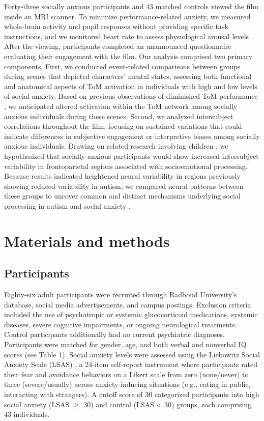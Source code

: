 Forty-three socially anxious participants and 43 matched controls viewed the film inside an MRI scanner. To minimize performance-related anxiety, we measured whole-brain activity and pupil responses without providing specific task instructions, and we monitored heart rate to assess physiological arousal levels \citep{wascher2021}. After the viewing, participants completed an unannounced questionnaire evaluating their engagement with the film. Our analysis comprised two primary components. First, we conducted event-related comparisons between groups during scenes that depicted characters' mental states, assessing both functional and anatomical aspects of ToM activation in individuals with high and low levels of social anxiety. Based on previous observations of diminished ToM performance \citep{baez2023}, we anticipated altered activation within the ToM network among socially anxious individuals during these scenes. Second, we analyzed intersubject correlations throughout the film, focusing on sustained variations that could indicate differences in subjective engagement or interpretive biases among socially anxious individuals. Drawing on related research involving children \citep{camacho2023}, we hypothesized that socially anxious participants would show increased intersubject variability in frontoparietal regions associated with socioemotional processing. Because results indicated heightened neural variability in regions previously showing reduced variability in autism, we compared neural patterns between these groups to uncover common and distinct mechanisms underlying social processing in autism and social anxiety \citep{white2009}.


\section*{Materials and methods}
\subsection*{Participants}
Eighty-six adult participants were recruited through Radboud University's database, social media advertisements, and campus postings. Exclusion criteria included the use of psychotropic or systemic glucocorticoid medications, systemic diseases, severe cognitive impairments, or ongoing neurological treatments. Control participants additionally had no current psychiatric diagnoses. Participants were matched for gender, age, and both verbal and nonverbal IQ scores \citep{raven1989,wechsler1997} (see Table 1). Social anxiety levels were assessed using the Liebowitz Social Anxiety Scale (LSAS) \citep{liebowitz1987,oakman2003}, a 24-item self-report instrument where participants rated their fear and avoidance behaviors on a Likert scale from zero (none/never) to three (severe/usually) across anxiety-inducing situations (e.g., eating in public, interacting with strangers). A cutoff score of 30 \citep{rytwinski2009} categorized participants into high social anxiety (LSAS $\geq$ 30) and control (LSAS < 30) groups, each comprising 43 individuals. 

